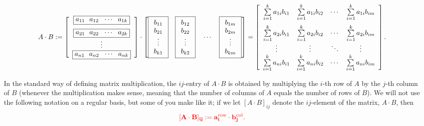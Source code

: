 \documentclass[letterpaper]{book}
\begin{document}
\begin{equation}
\label{eq:RowColumnMatrixMultiplication}
   A \cdot B:=  \left[\begin{array}{c}\boxed{a_{11}~~ a_{12}~~ \cdots~~ a_{1k}}  \medskip \\
\boxed{a_{21}~~ a_{22}~~ \cdots~~ a_{2k}} \\
\vdots \\
\boxed{a_{n1}~~ a_{n2}~~ \cdots~~ a_{nk}}\end{array}\right] \cdot 
\left[ \boxed{\begin{array}{c} b_{11} \\ b_{21}\\ \vdots \\ b_{k1}\end{array} }~~~
\boxed{\begin{array}{c} b_{12} \\ b_{22}\\ \vdots \\ b_{k2}\end{array} }~~~\cdots~~~
\boxed{\begin{array}{c} b_{1m} \\ b_{2m}\\ \vdots \\ b_{km}\end{array} }\right] =
%
\left[\begin{array}{cccc}  \sum\limits_{i=1}^k a_{1i}b_{i1} & \sum\limits_{i=1}^k a_{1i}b_{i2} & \cdots & \sum\limits_{i=1}^k a_{1i}b_{im}  \medskip \\
 \sum\limits_{i=1}^k a_{2i}b_{i1} & \sum\limits_{i=1}^k a_{2i}b_{i2} & \cdots & \sum\limits_{i=1}^k a_{2i}b_{im} \\
\vdots & \vdots & \ddots & \vdots \\
 \sum\limits_{i=1}^k a_{ni}b_{i1} & \sum\limits_{i=1}^k a_{ni}b_{i2} & \cdots & \sum\limits_{i=1}^k a_{ni}b_{im} \\
\end{array}\right].
\end{equation}

\begin{tcolorbox}[title=\textbf{Bottom Line on Standard Multiplication}] In the standard way of defining matrix multiplication, the
 $ij$-entry of $A \cdot B$ is obtained by multiplying the $i$-th row of $A$ by the $j$-th column of $B$ (whenever the multiplication makes sense, meaning that the number of columns of $A$ equals the number of rows of $B$). We will not use the following notation on a regular basis, but some of you make like it; if we let $[A \cdot B]_{ij}$ denote the $ij$-element of the matrix, $A\cdot B$, then 
 $$\textcolor{red}{\bf [A \cdot B]_{ij} := a_i^{\rm row} \cdot b_j^{\rm col}.} $$
\end{tcolorbox}
 
\end{document}
